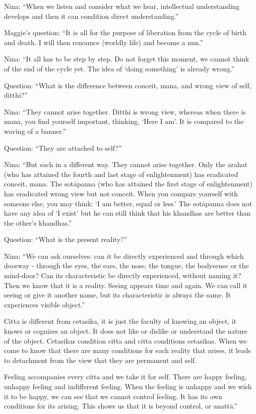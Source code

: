 Nina: ``When we listen and consider what we hear, intellectual understanding 
develops and then it can condition direct understanding.'' 

Maggie's question: ``It is all for the purpose of liberation from the cycle of birth 
and death. I will then renounce (worldly life) and become a nun.'' 

Nina: ``It all has to be step by step. Do not forget this moment, we cannot think 
of the end of the cycle yet. The idea of `doing something' is already wrong.'' 

Question: ``What is the difference between conceit, mana, and wrong view of 
self, ditthi?'' 

Nina: ``They cannot arise together. Ditthi is wrong view, whereas when there is 
mana, you find yourself important, thinking, `Here I am'. It is compared to the 
waving of a banner.'' 

Question: ``They are attached to self?'' 

Nina: ``But each in a different way. They cannot arise together. Only the arahat 
(who has attained the fourth and last stage of enlightenment) has eradicated 
conceit, mana. The sotāpanna (who has attained the first stage of enlightenment) 
has eradicated wrong view but not conceit. When you compare yourself with 
someone else, you may think: `I am better, equal or less.' The sotāpanna does 
not have any idea of `I exist' but he can still think that his khandhas are better 
than the other's khandhas.'' 

Question: ``What is the present reality?'' 

Nina: ``We can ask ourselves: can it be directly experienced and through which 
doorway - through the eyes, the ears, the nose, the tongue, the bodysense or the 
mind-door? Can its characteristic be directly experienced, without naming it? 
Then we know that it is a reality. Seeing appears time and again. We can call it 
seeing or give it another name, but its characteristic is always the same. It experiences visible object.'' 

Citta is different from cetasika, it is just the faculty of knowing an object, it 
knows or cognizes an object. It does not like or dislike or understand the nature 
of the object. Cetasikas condition citta and citta conditions cetasikas. When we 
come to know that there are many conditions for each reality that arises, it leads 
to detachment from the view that they are permanent and self. 

Feeling accompanies every citta and we take it for self. There are happy feeling, 
unhappy feeling and indifferent feeling. When the feeling is unhappy and we 
wish it to be happy, we can see that we cannot control feeling. It has its own 
conditions for its arising. This shows us that it is beyond control, or anattā.'' 

